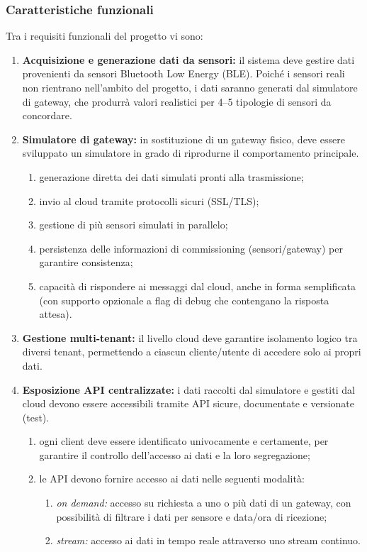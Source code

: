 \documentclass[a4paper,11pt]{article}
\begin{document}
\subsubsection{Caratteristiche funzionali}
Tra i requisiti funzionali del progetto vi sono:
\begin{enumerate}[noitemsep, topsep=0pt]
  \item \textbf{Acquisizione e generazione dati da sensori:} il sistema deve gestire dati provenienti da sensori Bluetooth Low Energy (BLE). Poiché i sensori reali non rientrano nell'ambito del progetto, i dati saranno generati dal simulatore di gateway, che produrrà valori realistici per 4--5 tipologie di sensori da concordare.

  \item \textbf{Simulatore di gateway:} in sostituzione di un gateway fisico, deve essere sviluppato un simulatore 
  in grado di riprodurne il comportamento principale.
  \begin{enumerate}
    \item generazione diretta dei dati simulati pronti alla trasmissione;
    \item invio al cloud tramite protocolli sicuri (SSL/TLS);
    \item gestione di più sensori simulati in parallelo;
    \item persistenza delle informazioni di commissioning (sensori/gateway) per garantire consistenza;
    \item capacità di rispondere ai messaggi dal cloud, anche in forma semplificata 
    (con supporto opzionale a flag di debug che contengano la risposta attesa).
  \end{enumerate}

  \item \textbf{Gestione multi-tenant:} il livello cloud deve garantire isolamento logico tra diversi tenant, 
  permettendo a ciascun cliente/utente di accedere solo ai propri dati.

  \item \textbf{Esposizione API centralizzate:} i dati raccolti dal simulatore e gestiti dal cloud devono essere accessibili 
  tramite API sicure, documentate e versionate (test).
  \begin{enumerate}
    \item ogni client deve essere identificato univocamente e certamente, per garantire il controllo 
    dell'accesso ai dati e la loro segregazione;
    \item le API devono fornire accesso ai dati nelle seguenti modalità:
    \begin{enumerate}
      \item \textit{on demand:} accesso su richiesta a uno o più dati di un gateway, 
      con possibilità di filtrare i dati per sensore e data/ora di ricezione;
      \item \textit{stream:} accesso ai dati in tempo reale attraverso uno stream continuo.
    \end{enumerate}
  \end{enumerate}


\end{enumerate}
\end{document}
